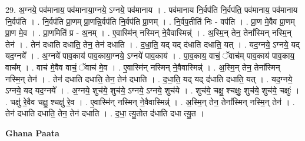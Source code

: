 \documentclass[17pt]{extarticle}
\begin{document}
29. अ॒ग्नये॒ पव॑मानाय॒ पव॑मानाया॒ग्नये॒ ऽग्नये॒ पव॑मानाय । . पव॑मानाय नि॒र्वप॑ति नि॒र्वप॑ति॒ पव॑मानाय॒ पव॑मानाय नि॒र्वप॑ति । . नि॒र्वप॑ति प्रा॒णम् प्रा॒णन्नि॒र्वप॑ति नि॒र्वप॑ति प्रा॒णम् । . नि॒र्वप॒तीति॑ निः - वप॑ति । . प्रा॒ण मे॒वैव प्रा॒णम् प्रा॒ण मे॒व । . प्रा॒णमिति॑ प्र - अ॒नम् । . ए॒वास्मि॑न् नस्मिन् ने॒वैवास्मिन्न्॑ । . अ॒स्मि॒न् तेन॒ तेना᳚स्मिन् नस्मि॒न् तेन॑ । . तेन॑ दधाति दधाति॒ तेन॒ तेन॑ दधाति । . द॒धा॒ति॒ यद् यद् द॑धाति दधाति॒ यत् । . यद॒ग्नये॒ ऽग्नये॒ यद् यद॒ग्नये᳚ । . अ॒ग्नये॑ पाव॒काय॑ पाव॒काया॒ग्नये॒ ऽग्नये॑ पाव॒काय॑ । . पा॒व॒काय॒ वाचं॒ ॅवाच॑म् पाव॒काय॑ पाव॒काय॒ वाच᳚म् । . वाच॑ मे॒वैव वाचं॒ ॅवाच॑ मे॒व । . ए॒वास्मि॑न् नस्मिन् ने॒वैवास्मिन्न्॑ । . अ॒स्मि॒न् तेन॒ तेना᳚स्मिन् नस्मि॒न् तेन॑ । . तेन॑ दधाति दधाति॒ तेन॒ तेन॑ दधाति । . द॒धा॒ति॒ यद् यद् द॑धाति दधाति॒ यत् । . यद॒ग्नये॒ ऽग्नये॒ यद् यद॒ग्नये᳚ । . अ॒ग्नये॒ शुच॑ये॒ शुच॑ये॒ ऽग्नये॒ ऽग्नये॒ शुच॑ये । . शुच॑ये॒ चक्षु॒ श्चक्षुः॒ शुच॑ये॒ शुच॑ये॒ चक्षुः॑ । . चक्षु॑ रे॒वैव चक्षु॒ श्चक्षु॑ रे॒व । . ए॒वास्मि॑न् नस्मिन् ने॒वैवास्मिन्न्॑ । . अ॒स्मि॒न् तेन॒ तेना᳚स्मिन् नस्मि॒न् तेन॑ । . तेन॑ दधाति दधाति॒ तेन॒ तेन॑ दधाति । . द॒धा॒ त्यु॒तोत द॑धाति दधा त्यु॒त । \newline

\textbf{Ghana Paata } \newline
\end{document}
